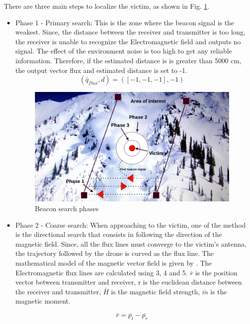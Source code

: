 \documentclass[conference]{IEEEtran}
\begin{document}
There are three main steps to localize the victim, as shown in Fig. \ref{fig:beaconSearchPhases}.
\begin{itemize}
\item Phase 1 - Primary search:  This is the zone where the beacon signal is the weakest. Since, the distance between the receiver and transmitter is too long, the receiver is unable to recognize the Electromagnetic field and outputs no signal. The effect of the environment noise is too high to get any reliable information. Therefore, if the estimated distance is is greater than 5000 cm, the output vector flux and estimated distance is set to -1.
\begin{equation}
(\bar{q}_{flux}, d) = ([-1,-1,-1], -1)
\end{equation}

\begin{figure}[htbp]
\centerline{\includegraphics[width=1\columnwidth]{beacon_searchPattern.png}}
\caption{Beacon search phases}
\label{fig:beaconSearchPhases}
\end{figure}


\item Phase 2 - Coarse search: When approaching to the victim, one of the method is the directional search that
consists in following the direction of the magnetic field.
Since, all the flux lines must converge to the victim’s
antenna, the trajectory followed by the drone is curved as the flux line. The mathematical model of the magnetic vector field is given by \cite{b2}. The Electromagnetic flux lines are calculated using 3, 4 and 5. ${\bar{r}}$ is the position vector between transmitter and receiver, r is the euclidean distance between the receiver and transmitter,  $\bar{H}$ is the magnetic field strength,  $\bar{m}$ is the magnetic moment.

\begin{equation}
{\bar{r}} = \bar{p_t} - \bar{p_r}
\end{equation}


\end{itemize}
\end{document}
